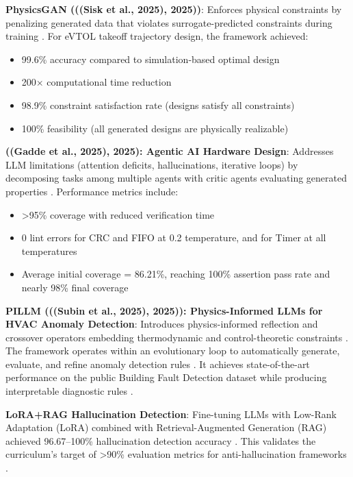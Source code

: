 \documentclass[12pt,a4paper]{article}
\begin{document}
\textbf{PhysicsGAN (((Sisk et al., 2025), 2025))}: Enforces physical constraints by penalizing generated data that violates surrogate-predicted constraints during training \cite{ref196}. For eVTOL takeoff trajectory design, the framework achieved:
\begin{itemize}
  \item 99.6\% accuracy compared to simulation-based optimal design \cite{ref197}
  \item 200$\times$ computational time reduction \cite{ref198}
  \item 98.9\% constraint satisfaction rate (designs satisfy all constraints) \cite{ref199}
  \item 100\% feasibility (all generated designs are physically realizable) \cite{ref200}
\end{itemize}

\textbf{((Gadde et al., 2025), 2025): Agentic AI Hardware Design}: Addresses LLM limitations (attention deficits, hallucinations, iterative loops) by decomposing tasks among multiple agents with critic agents evaluating generated properties \cite{ref201}. Performance metrics include:
\begin{itemize}
  \item >95\% coverage with reduced verification time \cite{ref202}
  \item 0 lint errors for CRC and FIFO at 0.2 temperature, and for Timer at all temperatures \cite{ref203}
  \item Average initial coverage = 86.21\%, reaching 100\% assertion pass rate and nearly 98\% final coverage \cite{ref204}
\end{itemize}

\textbf{PILLM (((Subin et al., 2025), 2025)): Physics-Informed LLMs for HVAC Anomaly Detection}: Introduces physics-informed reflection and crossover operators embedding thermodynamic and control-theoretic constraints \cite{ref205}. The framework operates within an evolutionary loop to automatically generate, evaluate, and refine anomaly detection rules \cite{ref206}. It achieves state-of-the-art performance on the public Building Fault Detection dataset while producing interpretable diagnostic rules \cite{ref207}.

\textbf{LoRA+RAG Hallucination Detection}: Fine-tuning LLMs with Low-Rank Adaptation (LoRA) combined with Retrieval-Augmented Generation (RAG) achieved 96.67--100\% hallucination detection accuracy \cite{ref208}. This validates the curriculum's target of >90\% evaluation metrics for anti-hallucination frameworks \cite{ref209}.
\end{document}
